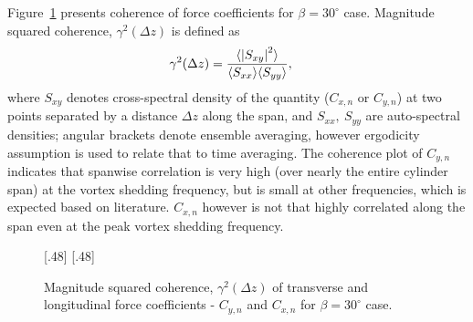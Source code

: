 Figure~\ref{fig:Coherence_Yawed30_Re20k} presents coherence of force
coefficients for $\beta=30^\circ$ case. Magnitude squared coherence,
$\gamma^2(\Delta z)$ is defined as
%
\begin{align}
  \gamma^2(\Delta z) &= \frac{\langle \left| S_{xy} \right|^2 \rangle}{\langle
    S_{xx}\rangle \langle S_{yy} \rangle},
  \label{eq:coherence}
\end{align}
%
where $S_{xy}$ denotes cross-spectral density of the quantity ($C_{x,n}$ or
$C_{y,n}$) at two points separated by a distance $\Delta z$ along the span, and
$S_{xx},~S_{yy}$ are auto-spectral densities; angular brackets denote ensemble
averaging, however ergodicity assumption is used to relate that to time
averaging. The coherence plot of $C_{y,n}$ indicates that spanwise correlation
is very high (over nearly the entire cylinder span) at the vortex shedding
frequency, but is small at other frequencies, which is expected based on
literature. $C_{x,n}$ however is not that highly correlated along the span even
at the peak vortex shedding frequency.
%
\begin{figure}[htb!]
    [.48\linewidth]{}
    [.48\linewidth]{}
  \hspace*{\fill}
    \caption{Magnitude squared coherence, $\gamma^2(\Delta z)$ of transverse
      and longitudinal force coefficients - $C_{y,n}$ and $C_{x,n}$ for
      $\beta=30^\circ$ case.}
  \label{fig:Coherence_Yawed30_Re20k}
\end{figure}
